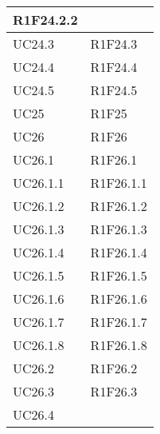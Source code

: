\begin{center}
\begin{longtable}{|p{44mm}|p{22mm}|}
R1F24.2.2 \newline
\\
\hline
UC24.3 &

R1F24.3 \newline
\\
\hline
UC24.4 &

R1F24.4 \newline
\\
\hline
UC24.5 &

R1F24.5 \newline
\\
\hline
UC25 &

R1F25 \newline
\\
\hline
UC26 &

R1F26 \newline
\\
\hline
UC26.1 &

R1F26.1 \newline
\\
\hline
UC26.1.1 &

R1F26.1.1 \newline
\\
\hline
UC26.1.2 &

R1F26.1.2 \newline
\\
\hline
UC26.1.3 &

R1F26.1.3 \newline
\\
\hline
UC26.1.4 &

R1F26.1.4 \newline
\\
\hline
UC26.1.5 &

R1F26.1.5 \newline
\\
\hline
UC26.1.6 &

R1F26.1.6 \newline
\\
\hline
UC26.1.7 &

R1F26.1.7 \newline
\\
\hline
UC26.1.8 &

R1F26.1.8 \newline
\\
\hline
UC26.2 &

R1F26.2 \newline
\\
\hline
UC26.3 &

R1F26.3 \newline
\\
\hline
UC26.4 &


\end{longtable}
\end{center}
